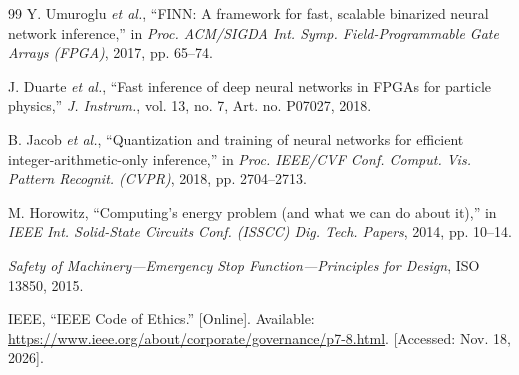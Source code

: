 \documentclass[10pt]{article}
\begin{document}
\begin{thebibliography}{99}
 Y. Umuroglu \emph{et al.}, ``FINN: A framework for fast, scalable binarized neural
network inference,'' in \emph{Proc. ACM/SIGDA Int. Symp. Field-Programmable Gate Arrays (FPGA)},
2017, pp. 65--74.

 J. Duarte \emph{et al.}, ``Fast inference of deep neural networks in FPGAs for
particle physics,'' \emph{J. Instrum.}, vol. 13, no. 7, Art. no. P07027, 2018.

 B. Jacob \emph{et al.}, ``Quantization and training of neural networks for
efficient integer-arithmetic-only inference,'' in \emph{Proc. IEEE/CVF Conf. Comput. Vis. Pattern
Recognit. (CVPR)}, 2018, pp. 2704--2713.

 M. Horowitz, ``Computing's energy problem (and what we can do about it),'' in
\emph{IEEE Int. Solid-State Circuits Conf. (ISSCC) Dig. Tech. Papers}, 2014, pp. 10--14.

 \emph{Safety of Machinery---Emergency Stop Function---Principles for Design},
ISO 13850, 2015.

 IEEE, ``IEEE Code of Ethics.'' [Online]. Available:
\url{https://www.ieee.org/about/corporate/governance/p7-8.html}. [Accessed: Nov. 18, 2026].

\end{thebibliography}
\end{document}
